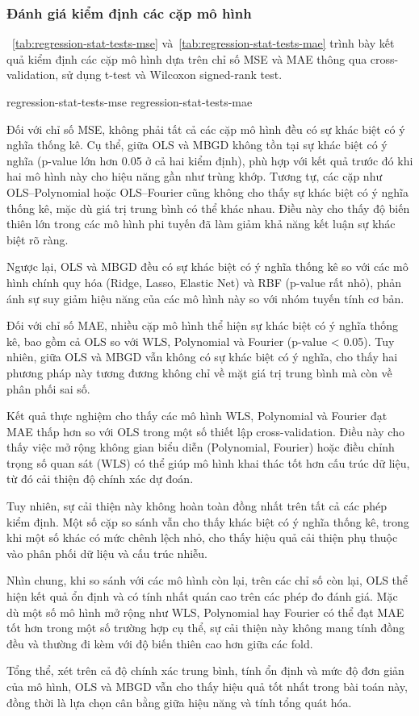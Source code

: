 \subsubsection{Đánh giá kiểm định các cặp mô hình}

\tablename~\ref{tab:regression-stat-tests-mse}
và~\ref{tab:regression-stat-tests-mae} trình bày kết quả kiểm định các cặp mô
hình dựa trên chỉ số MSE và MAE thông qua cross-validation, sử dụng t-test và
Wilcoxon signed-rank test.

{regression-stat-tests-mse}
{regression-stat-tests-mae}

Đối với chỉ số MSE, không phải tất cả các cặp mô hình đều có sự khác biệt có ý
nghĩa thống kê. Cụ thể, giữa OLS và MBGD không tồn tại sự khác biệt có ý nghĩa
(p-value lớn hơn 0.05 ở cả hai kiểm định), phù hợp với kết quả trước đó khi hai
mô hình này cho hiệu năng gần như trùng khớp. Tương tự, các cặp như
OLS--Polynomial hoặc OLS--Fourier cũng không cho thấy sự khác biệt có ý nghĩa
thống kê, mặc dù giá trị trung bình có thể khác nhau. Điều này cho thấy độ biến
thiên lớn trong các mô hình phi tuyến đã làm giảm khả năng kết luận sự khác
biệt rõ ràng.

Ngược lại, OLS và MBGD đều có sự khác biệt có ý nghĩa thống kê so với các mô
hình chính quy hóa (Ridge, Lasso, Elastic Net) và RBF (p-value rất nhỏ), phản
ánh sự suy giảm hiệu năng của các mô hình này so với nhóm tuyến tính cơ bản.

Đối với chỉ số MAE, nhiều cặp mô hình thể hiện sự khác biệt có ý nghĩa thống
kê, bao gồm cả OLS so với WLS, Polynomial và Fourier (p-value < 0.05). Tuy
nhiên, giữa OLS và MBGD vẫn không có sự khác biệt có ý nghĩa, cho thấy hai
phương pháp này tương đương không chỉ về mặt giá trị trung bình mà còn về phân
phối sai số.

Kết quả thực nghiệm cho thấy các mô hình WLS, Polynomial và Fourier đạt MAE
thấp hơn so với OLS trong một số thiết lập cross-validation. Điều này cho thấy
việc mở rộng không gian biểu diễn (Polynomial, Fourier) hoặc điều chỉnh trọng
số quan sát (WLS) có thể giúp mô hình khai thác tốt hơn cấu trúc dữ liệu, từ đó
cải thiện độ chính xác dự đoán.

Tuy nhiên, sự cải thiện này không hoàn toàn đồng nhất trên tất cả các phép kiểm
định. Một số cặp so sánh vẫn cho thấy khác biệt có ý nghĩa thống kê, trong khi
một số khác có mức chênh lệch nhỏ, cho thấy hiệu quả cải thiện phụ thuộc vào
phân phối dữ liệu và cấu trúc nhiễu.

Nhìn chung, khi so sánh với các mô hình còn lại, trên các chỉ số còn lại, OLS
thể hiện kết quả ổn định và có tính nhất quán cao trên các phép đo đánh giá.
Mặc dù một số mô hình mở rộng như WLS, Polynomial hay Fourier có thể đạt MAE
tốt hơn trong một số trường hợp cụ thể, sự cải thiện này không mang tính đồng
đều và thường đi kèm với độ biến thiên cao hơn giữa các fold.

Tổng thể, xét trên cả độ chính xác trung bình, tính ổn định và mức độ đơn giản
của mô hình, OLS và MBGD vẫn cho thấy hiệu quả tốt nhất trong bài toán này,
đồng thời là lựa chọn cân bằng giữa hiệu năng và tính tổng quát hóa.
